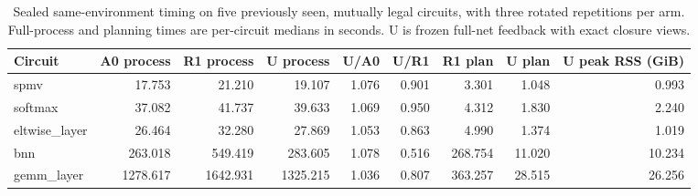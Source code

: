 \begin{table}[t]
\centering\small
\caption{Sealed same-environment timing on five previously seen, mutually legal circuits, with three rotated repetitions per arm. Full-process and planning times are per-circuit medians in seconds. U is frozen full-net feedback with exact closure views.}
\label{tab:formal-v14}
\begin{tabular}{lrrrrrrrr}
\hline
Circuit & A0 process & R1 process & U process & U/A0 & U/R1 & R1 plan & U plan & U peak RSS (GiB)\\
\hline
spmv & 17.753 & 21.210 & 19.107 & 1.076 & 0.901 & 3.301 & 1.048 & 0.993\\
softmax & 37.082 & 41.737 & 39.633 & 1.069 & 0.950 & 4.312 & 1.830 & 2.240\\
eltwise\_layer & 26.464 & 32.280 & 27.869 & 1.053 & 0.863 & 4.990 & 1.374 & 1.019\\
bnn & 263.018 & 549.419 & 283.605 & 1.078 & 0.516 & 268.754 & 11.020 & 10.234\\
gemm\_layer & 1278.617 & 1642.931 & 1325.215 & 1.036 & 0.807 & 363.257 & 28.515 & 26.256\\
\hline
\end{tabular}
\end{table}
